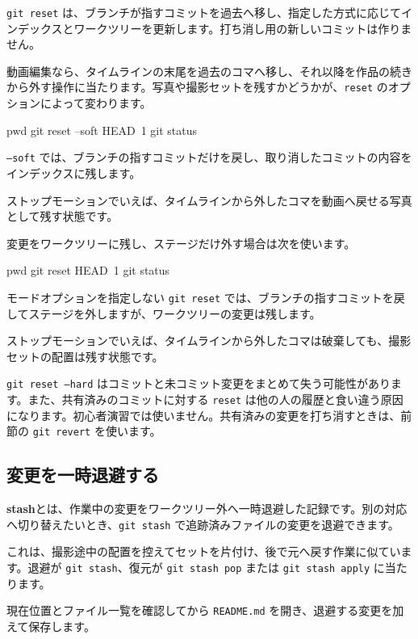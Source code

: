 \documentclass[a4paper,11pt]{jlreq}
\newcommand{\cmd}[1]{\texttt{#1}}
\newcommand{\term}[1]{\textbf{#1}}
\begin{document}
\cmd{git reset} は、ブランチが指すコミットを過去へ移し、指定した方式に応じてインデックスとワークツリーを更新します。打ち消し用の新しいコミットは作りません。

動画編集なら、タイムラインの末尾を過去のコマへ移し、それ以降を作品の続きから外す操作に当たります。写真や撮影セットを残すかどうかが、\cmd{reset} のオプションによって変わります。

\begin{codeblock}
pwd
git reset --soft HEAD~1
git status
\end{codeblock}

\cmd{--soft} では、ブランチの指すコミットだけを戻し、取り消したコミットの内容をインデックスに残します。

ストップモーションでいえば、タイムラインから外したコマを動画へ戻せる写真として残す状態です。

変更をワークツリーに残し、ステージだけ外す場合は次を使います。

\begin{codeblock}
pwd
git reset HEAD~1
git status
\end{codeblock}

モードオプションを指定しない \cmd{git reset} では、ブランチの指すコミットを戻してステージを外しますが、ワークツリーの変更は残します。

ストップモーションでいえば、タイムラインから外したコマは破棄しても、撮影セットの配置は残す状態です。

\cmd{git reset --hard} はコミットと未コミット変更をまとめて失う可能性があります。また、共有済みのコミットに対する \cmd{reset} は他の人の履歴と食い違う原因になります。初心者演習では使いません。共有済みの変更を打ち消すときは、前節の \cmd{git revert} を使います。

\subsection{変更を一時退避する}

\term{stash}とは、作業中の変更をワークツリー外へ一時退避した記録です。別の対応へ切り替えたいとき、\cmd{git stash} で追跡済みファイルの変更を退避できます。

これは、撮影途中の配置を控えてセットを片付け、後で元へ戻す作業に似ています。退避が \cmd{git stash}、復元が \cmd{git stash pop} または \cmd{git stash apply} に当たります。

現在位置とファイル一覧を確認してから \cmd{README.md} を開き、退避する変更を加えて保存します。
\end{document}
